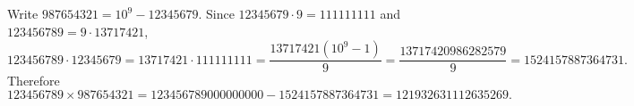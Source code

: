 Write $987654321=10^9-12345679$. Since $12345679\cdot9=111111111$ and $123456789=9\cdot13717421$,
\[123456789\cdot12345679=13717421\cdot111111111=\dfrac{13717421\left(10^9-1\right)}{9}=\dfrac{13717420986282579}{9}=1524157887364731.\]
Therefore
\[123456789\times987654321=123456789000000000-1524157887364731=\boxed{121932631112635269}.\]
